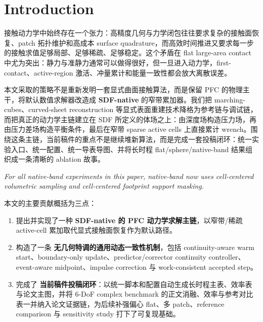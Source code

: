 \section{Introduction}
接触动力学中始终存在一个张力：高精度几何与力学闭包往往要求复杂的接触面恢复、patch 拓扑维护和高成本 surface quadrature，而高效时间推进又要求每一步的接触求值足够局部、足够稀疏、足够稳定。这个矛盾在 flat large-area contact 中尤为突出：静力与准静力通常可以做得很好，但一旦进入动力学，first-contact、active-region 激活、冲量累计和能量一致性都会放大离散误差。

本文采取的策略不是重新发明一套显式曲面接触算法，而是保留 PFC 的物理主干，将默认数值求解器改造成 \textbf{SDF-native} 的窄带累加器。我们把 marching-cubes、curved-sheet reconstruction 等显式表面重建技术降格为参考链与调试链，而把真正的动力学主链建立在 SDF 所定义的体场之上：由深度场构造压力场，再由压力差场构造平衡条件，最后在窄带 sparse active cells 上直接累计 wrench。围绕这条主链，当前稿件的重点不是继续堆新算法，而是完成一套投稿闭环：统一实验入口、统一配置、统一导表导图、并将长时程 flat/sphere/native-band 结果组织成一条清晰的 ablation 故事。

\noindent\textit{For all native-band experiments in this paper, native-band now uses cell-centered volumetric sampling and cell-centered footprint support masking.}

本文的主要贡献概括为三点：
\begin{enumerate}
    \item 提出并实现了一种 \textbf{SDF-native 的 PFC 动力学求解主链}，以窄带/稀疏 active-cell 累加取代显式接触面恢复作为默认路径。
    \item 构造了一条 \textbf{无几何特调的通用动态一致性机制}，包括 continuity-aware warm start、boundary-only update、predictor/corrector continuity controller、event-aware midpoint、impulse correction 与 work-consistent accepted step。
    \item 完成了 \textbf{当前稿件投稿闭环}：以统一脚本和配置自动生成长时程主表、效率表与论文主图，并将 6-DoF complex benchmark 的正文消融、效率与参考对比表一并纳入论文证据链，为后续补强偏心 flat、多 patch、reference comparison 与 sensitivity study 打下了可复现基础。
\end{enumerate}
